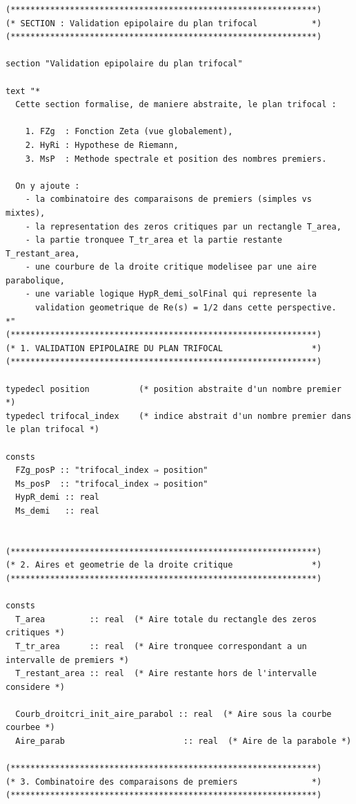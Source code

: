 \documentclass[a4paper,11pt]{article}
\begin{document}
\begin{holcode}[title={\textcolor{white}{Fichier : methode\_spectral.thy -- Partie 1/4}}]
\begin{lstlisting}
(**************************************************************)
(* SECTION : Validation epipolaire du plan trifocal           *)
(**************************************************************)

section "Validation epipolaire du plan trifocal"

text "*
  Cette section formalise, de maniere abstraite, le plan trifocal :

    1. FZg  : Fonction Zeta (vue globalement),
    2. HyRi : Hypothese de Riemann,
    3. MsP  : Methode spectrale et position des nombres premiers.

  On y ajoute :
    - la combinatoire des comparaisons de premiers (simples vs mixtes),
    - la representation des zeros critiques par un rectangle T_area,
    - la partie tronquee T_tr_area et la partie restante T_restant_area,
    - une courbure de la droite critique modelisee par une aire parabolique,
    - une variable logique HypR_demi_solFinal qui represente la
      validation geometrique de Re(s) = 1/2 dans cette perspective.
*"
(**************************************************************)
(* 1. VALIDATION EPIPOLAIRE DU PLAN TRIFOCAL                  *)
(**************************************************************)

typedecl position          (* position abstraite d'un nombre premier *)
typedecl trifocal_index    (* indice abstrait d'un nombre premier dans le plan trifocal *)

consts
  FZg_posP :: "trifocal_index ⇒ position"
  Ms_posP  :: "trifocal_index ⇒ position"
  HypR_demi :: real
  Ms_demi   :: real


(**************************************************************)
(* 2. Aires et geometrie de la droite critique                *)
(**************************************************************)

consts
  T_area         :: real  (* Aire totale du rectangle des zeros critiques *)
  T_tr_area      :: real  (* Aire tronquee correspondant a un intervalle de premiers *)
  T_restant_area :: real  (* Aire restante hors de l'intervalle considere *)

  Courb_droitcri_init_aire_parabol :: real  (* Aire sous la courbe courbee *)
  Aire_parab                        :: real  (* Aire de la parabole *)

(**************************************************************)
(* 3. Combinatoire des comparaisons de premiers               *)
(**************************************************************)


\end{lstlisting}
\end{holcode}
\end{document}
